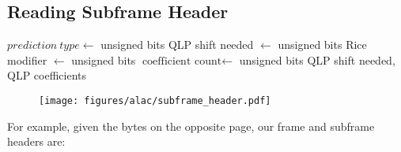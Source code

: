 \clearpage

\subsection{Reading Subframe Header}
$prediction~type \leftarrow$  unsigned bits
QLP shift needed $\leftarrow$  unsigned bits\;
Rice modifier $\leftarrow$  unsigned bits
$\text{coefficient count} \leftarrow$  unsigned bits
\Return QLP shift needed, QLP coefficients
\EALGORITHM
\begin{figure}[h]
\texttt{[image: figures/alac/subframe\_header.pdf]}
\end{figure}
\par
\noindent
For example, given the bytes on the opposite page,
our frame and subframe headers are:
